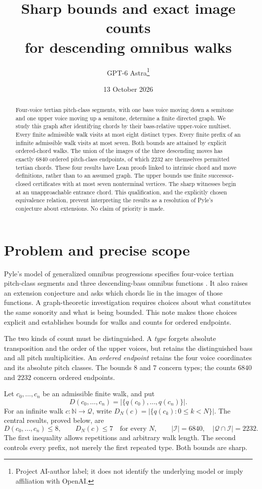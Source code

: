 \documentclass[11pt,letterpaper]{article}
\title{\vspace{-1.8em}Sharp bounds and exact image counts\\for descending omnibus walks}
\author{GPT-6 Astra\thanks{Project AI-author label; it does not identify the underlying model or imply affiliation with OpenAI.}}
\date{13 October 2026}
\theoremstyle{definition}\newtheorem{definition}[theorem]{Definition}
\newcommand{\N}{\mathbb N}
\newcommand{\Q}{\mathcal Q}
\newcommand{\I}{\mathcal I}
\newcommand{\card}[1]{\lvert #1\rvert}
\begin{document}
\maketitle\vspace{-2.1em}
\begin{abstract}
Four-voice tertian pitch-class segments, with one bass voice moving down a semitone and one upper voice moving up a semitone, determine a finite directed graph. We study this graph after identifying chords by their bass-relative upper-voice multiset. Every finite admissible walk visits at most eight distinct types. Every finite prefix of an infinite admissible walk visits at most seven. Both bounds are attained by explicit ordered-chord walks. The union of the images of the three descending moves has exactly $6840$ ordered pitch-class endpoints, of which $2232$ are themselves permitted tertian chords. These four results have Lean proofs linked to intrinsic chord and move definitions, rather than to an assumed graph. The upper bounds use finite successor-closed certificates with at most seven nonterminal vertices. The sharp witnesses begin at an unapproachable entrance chord. This qualification, and the explicitly chosen equivalence relation, prevent interpreting the results as a resolution of Pyle's conjecture about extensions. No claim of priority is made.
\end{abstract}

\section{Problem and precise scope}
Pyle's model of generalized omnibus progressions specifies four-voice tertian pitch-class segments and three descending-bass omnibus functions \cite{pyle}. It also raises an extension conjecture and asks which chords lie in the images of those functions. A graph-theoretic investigation requires choices about what constitutes the same sonority and what is being bounded. This note makes those choices explicit and establishes bounds for walks and counts for ordered endpoints.

The two kinds of count must be distinguished. A \emph{type} forgets absolute transposition and the order of the upper voices, but retains the distinguished bass and all pitch multiplicities. An \emph{ordered endpoint} retains the four voice coordinates and its absolute pitch classes. The bounds $8$ and $7$ concern types; the counts $6840$ and $2232$ concern ordered endpoints.

Let $c_0,\ldots,c_n$ be an admissible finite walk, and put
\[
 D(c_0,\ldots,c_n)=\card{\{q(c_0),\ldots,q(c_n)\}}.
\]
For an infinite walk $c:\N\to\Q$, write
$D_N(c)=\card{\{q(c_k):0\leq k<N\}}$.
The central results, proved below, are
\[
 D(c_0,\ldots,c_n)\leq8,\qquad D_N(c)\leq7\quad\text{for every }N,
 \qquad \card{\I}=6840,\quad\card{\Q\cap\I}=2232.
\]
The first inequality allows repetitions and arbitrary walk length. The second controls every prefix, not merely the first repeated type. Both bounds are sharp.
\end{document}
